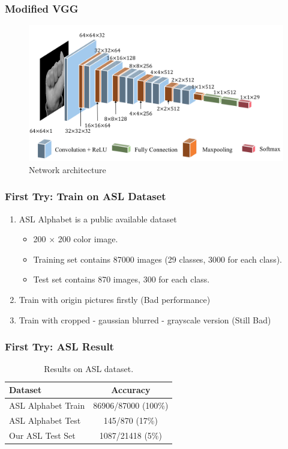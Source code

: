 \documentclass[handout]{beamer}
\begin{document}
\begin{frame}
\frametitle{Modified VGG}

\begin{figure}
\begin{center}
\includegraphics[scale=0.13]{imgs/arch}
\end{center}
\caption{Network architecture}
\end{figure}

\end{frame}


\begin{frame}
\frametitle{First Try: Train on ASL Dataset}

\begin{enumerate}
	\item<+-| structure@+> ASL Alphabet is a public available dataset
	\begin{itemize}
		\item 200 $\times$ 200 color image.
		\item Training set contains 87000 images (29 classes, 3000 for each class).
		\item Test set contains 870 images, 300 for each class.
	\end{itemize}
	\item<+-| structure@+> Train with origin pictures firstly (Bad performance)
	\item<+-| structure@+> Train with cropped - gaussian blurred - grayscale version (Still Bad)
\end{enumerate}

\end{frame}

\begin{frame}
\frametitle{First Try: ASL Result}

\begin{table}[h]
\begin{center}
\begin{tabular}{|l|c|}
\hline
Dataset & Accuracy \\
\hline\hline
ASL Alphabet Train & 86906/87000 (100\%) \\
ASL Alphabet Test & 145/870 (17\%) \\
Our ASL Test Set & 1087/21418 (5\%) \\
\hline
\end{tabular}
\end{center}
\caption{Results on ASL dataset.}
\label{table:result}
\end{table}

\end{frame}
\end{document}
